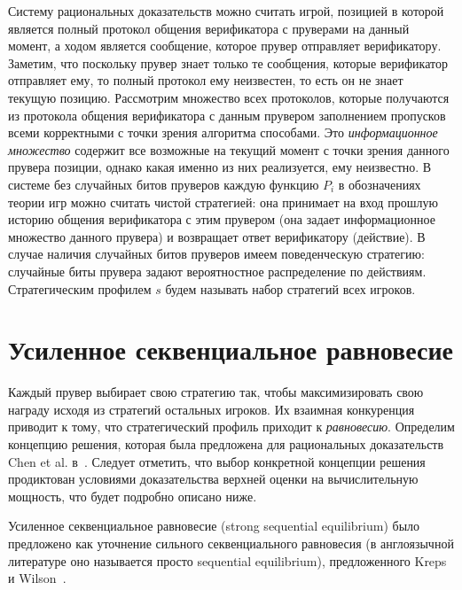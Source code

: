 \documentclass[14pt, a4paper]{extreport}
\begin{document}
        Систему рациональных доказательств можно считать игрой, позицией в которой является полный протокол общения верификатора с пруверами на данный момент, а ходом является сообщение, которое прувер отправляет верификатору. Заметим, что поскольку прувер знает только те сообщения, которые верификатор отправляет ему, то полный протокол ему неизвестен, то есть он не знает текущую позицию.
        Рассмотрим множество всех протоколов, которые получаются из протокола общения верификатора с данным прувером заполнением пропусков всеми корректными с точки зрения алгоритма способами.
        Это \textit{информационное множество} содержит все возможные на текущий момент с точки зрения данного прувера позиции, однако какая именно из них реализуется, ему неизвестно.
        В системе без случайных битов пруверов каждую функцию $P_i$ в обозначениях теории игр можно считать чистой стратегией: она принимает на вход прошлую историю общения верификатора с этим прувером (она задает информационное множество данного прувера) и возвращает ответ верификатору (действие). В случае наличия случайных битов пруверов имеем поведенческую стратегию: случайные биты прувера задают вероятностное распределение по действиям. Стратегическим профилем $s$ будем называть набор стратегий всех игроков.

        \section{Усиленное секвенциальное равновесие}

        Каждый прувер выбирает свою стратегию так, чтобы максимизировать свою награду исходя из стратегий остальных игроков.
        Их взаимная конкуренция приводит к тому, что стратегический профиль приходит к \textit{равновесию}. Определим концепцию решения, которая была предложена для рациональных доказательств Chen et al. в~\cite{chen2017noncoop}.
        Следует отметить, что выбор конкретной концепции решения продиктован условиями доказательства верхней оценки на вычислительную мощность, что будет подробно описано ниже.

        Усиленное секвенциальное равновесие (strong sequential equilibrium) было предложено как уточнение сильного секвенциального равновесия (в англоязычной литературе оно называется просто sequential equilibrium), предложенного Kreps и Wilson~\cite{kreps1982sequential}.
\end{document}
